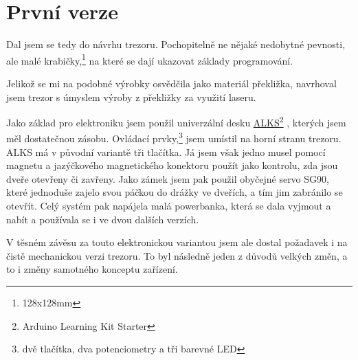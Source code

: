 \section{První verze}
\label{E1-vyvoj}

Dal jsem se tedy do návrhu trezoru. Pochopitelně ne nějaké nedobytné pevnosti, ale malé
krabičky,\footnote{128x128mm} na které se dají ukazovat základy programování. 

Jelikož se mi na podobné výrobky osvědčila jako materiál překližka, navrhoval jsem trezor s úmyslem výroby z překližky za využití laseru. 

Jako základ pro elektroniku  jsem použil univerzální 
desku \href{https://github.com/RoboticsBrno/ArduinoLearningKitStarter}{ALKS}\footnote{Arduino Learning Kit Starter} \parencite{ALKS}, 
kterých jsem měl dostatečnou zásobu. Ovládací prvky,\footnote{dvě tlačítka, dva potenciometry a tři barevné LED} jsem umístil na horní stranu trezoru. 
ALKS má v původní variantě tři tlačítka. Já jsem však jedno musel pomocí magnetu a jazýčkového magnetického konektoru použít
jako kontrolu, zda jsou dveře otevřeny či zavřeny. %
Jako zámek jsem pak použil obyčejné servo
SG90, které jednoduše zajelo svou páčkou do drážky ve dveřích, a tím jim zabránilo 
se otevřít. Celý systém pak napájela malá powerbanka, která se dala vyjmout a nabít  
a používala se i ve dvou dalších verzích.


V těsném závěsu za touto elektronickou variantou jsem ale dostal poža\-da\-vek i na čistě mechanickou verzi trezoru. 
To byl následně jeden z důvodů velkých změn, a to i změny samotného konceptu zařízení.
